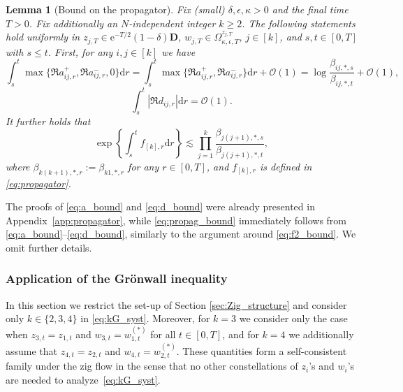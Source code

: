 \documentclass[10pt]{amsart}
\newtheorem{lemma}[theorem]{Lemma}
\numberwithin{equation}{section}
\newcommand{\dif}{\mathrm{d}}
\newcommand{\ee}{\mathrm{e}}
\begin{document}
\begin{lemma}[Bound on the propagator]\label{lem:propag_bound} Fix (small) $\delta, \epsilon,\kappa>0$ and the final time $T>0$. Fix additionally an $N$-independent integer $k\ge 2$. The following statements hold uniformly in $z_{j,T}\in \ee^{-T/2}(1-\delta)\mathbf{D}$, $w_{j,T}\in \Omega_{\kappa,\epsilon,T}^{z_{j,T}}$, $j\in[k]$, and $s,t\in [0,T]$ with $s\le t$. First, for any $i,j\in [k]$ we have
\begin{equation}
\int_s^t \max\{\Re a_{ij,r}^+,\Re a_{ij,r}^-,0\}\dif r=\int_s^t \max\{\Re a_{ij,r}^+,\Re a_{ij,r}^-\}\dif r + \mathcal{O}(1) = \log  \frac{\beta_{ij,*,s}}{\beta_{ij,*,t}} + \mathcal{O}(1),\label{eq:a_bound}
\end{equation}
\begin{equation}
\int_s^t |\Re d_{ij,r}|\dif r=\mathcal{O}(1). \label{eq:d_bound}
\end{equation}
It further holds that
\begin{equation}
\exp\left\lbrace \int_s^t f_{[k],r}\dif r\right\rbrace \lesssim \prod_{j=1}^k \frac{\beta_{j(j+1),*,s}}{\beta_{j(j+1),*,t}},
\label{eq:propag_bound}
\end{equation}
where $\beta_{k(k+1),*,r}:=\beta_{k1,*,r}$ for any $r\in [0,T]$, and $f_{[k],r}$ is defined in \eqref{eq:propagator}.
\end{lemma}

The proofs of \eqref{eq:a_bound} and \eqref{eq:d_bound} were already presented in Appendix~\ref{app:propagator}, while \eqref{eq:propag_bound} immediately follows from \eqref{eq:a_bound}--\eqref{eq:d_bound}, similarly to the argument around \eqref{eq:f2_bound}. We omit further details.

\subsubsection{Application of the Gr{\"o}nwall inequality}\label{sec:Gronwall}

In this section we restrict the set-up of Section \ref{sec:Zig_structure} and consider only $k\in\{2,3,4\}$ in \eqref{eq:kG_syst}. Moreover, for $k=3$ we consider only the case when $z_{3,t}=z_{1,t}$ and $w_{3,t}=w_{1,t}^{(*)}$ for all $t\in [0,T]$, and for $k=4$ we additionally assume that $z_{4,t}=z_{2,t}$ and $w_{4,t}=w_{2,t}^{(*)}$. These quantities form a self-consistent family under the zig flow in the sense that no other constellations of $z_i$'s and $w_i$'s are needed to analyze~\eqref{eq:kG_syst}.
\end{document}
